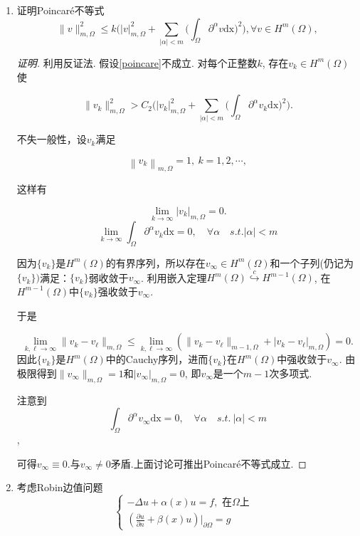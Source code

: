 \documentclass[12pt,a4paper]{article}
\begin{document}
\begin{enumerate}
		\item 证明Poincaré不等式
		\begin{equation}
			\|v\|_{m,\Omega}^2\leq k\Big(|v|_{m,\Omega}^2+\sum_{|\alpha|<m}\Big(\int_\Omega\partial^\alpha v\mathrm{dx}\Big)^2\Big),\forall v\in H^m(\Omega),\label{poincare}
		\end{equation}
		
		\begin{proof}[证明]
			利用反证法. 假设\eqref{poincare}不成立. 对每个正整数$k$, 存在$v_k\in H^m(\Omega)$使
			
			$$
			\|v_k\|^2_{m,\Omega}>C_2\Big(|v_k|_{m,\Omega}^2+\sum_{|\alpha|<m}\Big(\int_\Omega\partial^\alpha v_k\mathrm{dx}\Big)^2\Big).
			$$
			
			不失一般性，设$v_k$满足
			
			$$
			\left\|v_k\right\|_{m,\Omega}=1,\:k=1,2,\cdots,
			$$
			
			这样有
			
			$$
			\lim_{k\to\infty}|v_k|_{m,\Omega}=0.
			$$
			$$
			\lim_{k\to\infty}\int_\Omega\partial^\alpha v_k\mathrm{dx} = 0, \quad \forall \alpha \quad s.t. |\alpha|<m
			$$
			
			因为$\{v_k\}$是$H^m(\Omega)$的有界序列，所以存在$v_\infty\in H^m(\Omega)$和一个子列(仍记为$\{v_k\})$满足：$\{v_k\}$弱收敛于$v_\infty$. 利用嵌入定理$H^m(\Omega)\overset{c}{\operatorname*{\hookrightarrow}}H^{m-1}(\Omega)$,
			在$H^{m-1}(\Omega)$中$\{v_k\}$强收敛于$v_{\infty}.$
			
			于是
			
			$$
			\lim_{k,\ell\to\infty}\|v_k-v_\ell\|_{m,\Omega}\leq\lim_{k,\ell\to\infty}\left(\|v_k-v_\ell\|_{m-1,\Omega}+|v_k-v_\ell|_{m,\Omega}\right)=0.
			$$
			因此$\{v_k\}$是$H^m(\Omega)$中的Cauchy序列，进而$\{v_k\}$在$H^m(\Omega)$中强收敛于$v_\infty.$ 由极限得到$\|v_\infty\|_{m,\Omega}=1$和$|v_\infty|_{m,\Omega}=0$, 即$v_{\infty}$是一个$m-1$次多项式. 
			
			注意到
			$$
			\int_\Omega\partial^\alpha v_\infty \mathrm{dx} = 0, \quad \forall \alpha \quad s.t. \ |\alpha|<m
			$$,
			
			可得$v_\infty\equiv0$.与$v_\infty\neq0$矛盾.上面讨论可推出Poincaré不等式成立.
			
			
		\end{proof}
		
		\item 考虑Robin边值问题
		\begin{equation}
			\begin{cases}-\Delta u+\alpha(x)u=f,\text{ 在}\Omega \text{上}\\(\frac{\partial u}{\partial n}+\beta(x)u)\left.\right|_{\partial\Omega}=g&\end{cases}
			\label{robin}
		\end{equation}
		

\end{enumerate}
\end{document}
